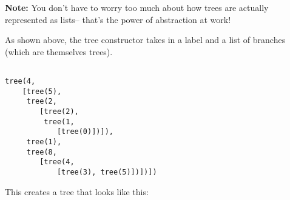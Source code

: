 \textbf{Note:} You don't have to worry too much about how trees are actually represented as lists-- that's the power of abstraction at work!

As shown above, the tree constructor takes in a label and a list of branches (which are themselves trees).

\begin{lstlisting}

tree(4,
    [tree(5),
     tree(2,
        [tree(2),
         tree(1,
            [tree(0)])]),
     tree(1),
     tree(8,
        [tree(4,
            [tree(3), tree(5)])])])
\end{lstlisting}

This creates a tree that looks like this:

